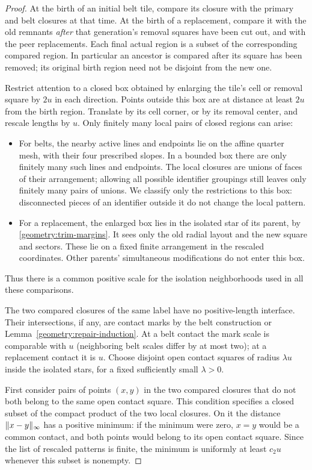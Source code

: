 \begin{proof}
At the birth of an initial belt tile, compare its closure with the
primary and belt closures at that time.  At the birth of a replacement,
compare it with the old remnants \emph{after} that generation's removal
squares have been cut out, and with the peer replacements.  Each final
actual region is a subset of the corresponding compared region.  In
particular an ancestor is compared after its square has been removed;
its original birth region need not be disjoint from the new one.

Restrict attention to a closed box obtained by enlarging the tile's cell
or removal square by $2u$ in each direction.  Points outside this box are
at distance at least $2u$ from the birth region.  Translate by its cell
corner, or by its removal center, and rescale lengths by $u$.  Only
finitely many local pairs of closed regions can arise:
\begin{itemize}
\item
For belts, the nearby active lines and endpoints lie on the affine
quarter mesh, with their four prescribed slopes.  In a bounded box there
are only finitely many such lines and endpoints.  The local closures are
unions of faces of their arrangement; allowing all possible identifier
groupings still leaves only finitely many pairs of unions.  We classify
only the restrictions to this box: disconnected pieces of an identifier
outside it do not change the local pattern.
\item
For a replacement, the enlarged box lies in the isolated star of its
parent, by \eqref{geometry:trim-margins}.  It sees only the old radial
layout and the new square and sectors.  These lie on a fixed finite
arrangement in the rescaled coordinates.  Other parents' simultaneous
modifications do not enter this box.
\end{itemize}
Thus there is a common positive scale for the isolation neighborhoods
used in all these comparisons.

The two compared closures of the same label have no positive-length
interface.  Their intersections, if any, are contact marks by the belt
construction or Lemma~\ref{geometry:repair-induction}.  At a belt contact
the mark scale is comparable with $u$ (neighboring belt scales differ by
at most two); at a replacement contact it is $u$.  Choose disjoint open
contact squares of radius $\lambda u$ inside the isolated stars, for a
fixed sufficiently small $\lambda>0$.

First consider pairs of points $(x,y)$ in the two compared closures that
do not both belong to the same open contact square.  This condition
specifies a closed subset of the compact product of the two local
closures.  On it the distance $\lVert x-y\rVert_\infty$ has a positive minimum:
if the minimum were zero, $x=y$ would be a common contact, and both points
would belong to its open contact square.  Since the list of rescaled
patterns is finite, the minimum is uniformly at least $c_2u$ whenever
this subset is nonempty.


\end{proof}
